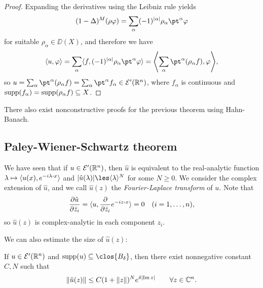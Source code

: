 \begin{proof}
Expanding the derivatives using the Leibniz rule yields
\[
(1 -\Delta)^M (\rho\phi) = \sum_\alpha (-1)^{\abs{\alpha}} \rho_\alpha \pt^\alpha\phi
\]
for suitable $\rho_\alpha \in \DD(X)$, and therefore we have
\[
\ang{u, \phi} = \sum_\alpha \ang{f, (-1)^{\abs{\alpha}} \rho_\alpha \pt^\alpha\phi} = \ang*{\sum_\alpha \pt^\alpha(\rho_\alpha f), \phi},
\]
so $u = \sum_\alpha \pt^\alpha(\rho_\alpha f) = \sum_\alpha \pt^\alpha f_\alpha \in \EE'(\RR^n)$, where $f_\alpha$ is continuous and $\operatorname{supp}(f_\alpha) = \operatorname{supp}(\rho_\alpha f) \subseteq X$. 
\end{proof}

There also exist nonconstructive proofs for the previous theorem using Hahn-Banach. 

\subsection{Paley-Wiener-Schwartz theorem}
We have seen that if $u \in \mathcal E'(\mathbb R^n)$, then $\hat u$ is equivalent to the real-analytic function $\lambda \mapsto \ang{u(x), e^{-i\lambda \vdot x}}$ and $\abs{\hat u(\lambda)} \les \ang{\lambda}^N$ for some $N \geq 0$. 
We consider the complex extension of $\hat u$, and we call $\hat u(z)$ the \emph{Fourier-Laplace transform} of $u$. 
Note that
\[
\pdv{\hat u}{\bar z_i} = \ang{u, \pdv{\bar z_i} e^{-iz\vdot x}} = 0 \quad(i = 1, \dotsc, n), 
\]
so $\hat u(z)$ is complex-analytic in each component $z_i$. 

We can also estimate the size of $\hat u(z)$:
\begin{lemma}
	If $u \in \mathcal E'(\mathbb R^n)$ and $\supp(u) \subseteq \clos{B_\delta}$, then there exist nonnegative constant $C, N$ such that
	\[
	\norm{\hat u(z)} \leq C (1 + \norm{z})^N e^{\delta \abs{\Im z}} \qquad \forall z \in \mathbb C^n. 
	\]
\end{lemma}

